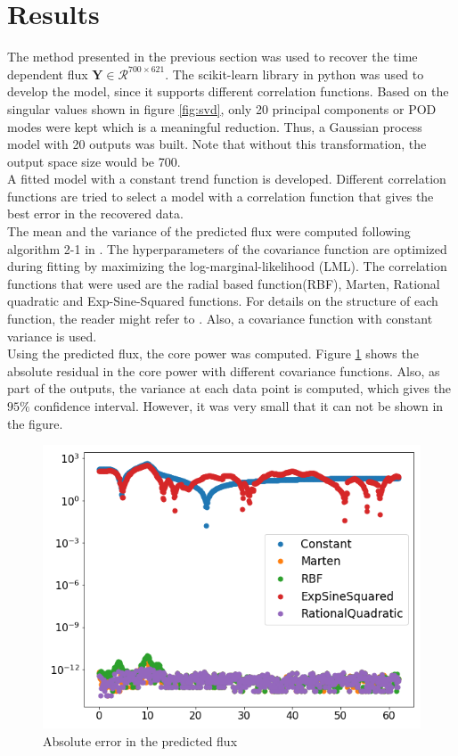 \documentclass{anstrans}
\begin{document}
\section{Results}
The method presented in the previous section was used to recover the time dependent flux $\textbf{Y} \in \mathcal{R}^{700\times 621}$. The scikit-learn library in python\cite{scikit-learn} was used to develop the model, since it supports different correlation functions.
Based on the singular values shown in figure \ref{fig:svd}, only 20 principal components or POD modes were kept which is a meaningful reduction. Thus, a Gaussian process model with 20 outputs was built. Note that without this transformation, the output space size would be 700.\\
A fitted model with a constant trend function is developed. Different correlation functions are tried to   select a model with a correlation function that gives the best error in the recovered data. \\
The mean and the variance of the predicted flux were computed following algorithm 2-1 in \cite{rasmussen2003gaussian}. The hyperparameters of the covariance function are optimized during fitting by maximizing the log-marginal-likelihood (LML).
The correlation functions that were used are the radial based function(RBF), Marten, Rational quadratic and Exp-Sine-Squared functions.
For details on the structure of each function, the reader might refer to \cite{rasmussen2003gaussian}. Also, a covariance function with constant variance is used.\\
Using the predicted flux, the core power was computed. Figure \ref{gp_kernels} shows the absolute residual in the core power with different covariance functions.
Also, as part of the outputs, the variance at each data point is computed, which gives the $95\%$ confidence interval. However, it was very small that it can not be shown in the figure.
\begin{figure}[ht!]
	\includegraphics[scale=0.4]{./figs/gp_kernels.png}
	\caption{Absolute error in the predicted flux}
	\label{gp_kernels}
\end{figure}
\end{document}
